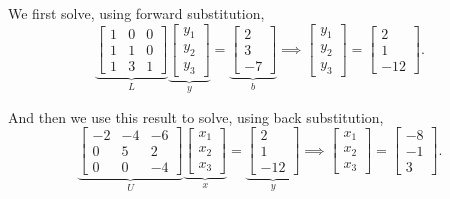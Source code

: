 We first solve, using forward substitution, 
$$\underbrace{\left[\begin{array}{rrr} 1 & 0 & 0\\ 1 & 1 & 0\\ 1 & 3 & 1\end{array} \right]}_{L} \underbrace{\begin{bmatrix}y_1 \\y_2 \\ y_3 \end{bmatrix}}_{y} =\underbrace{\left[\begin{array}{r} 2\\
3 \\ -7 \end{array}\right]}_{b} \implies\begin{bmatrix}y_1 \\y_2 \\ y_3 \end{bmatrix} = \left[\begin{array}{r} 2\\
1 \\ -12\end{array}\right]. $$

And then we use this result to solve, using back substitution,
$$ \underbrace{\left[\begin{array}{rrr} -2 & -4 & -6 \\ 0 & 5 &  2 \\ 0 &  0 & -4\end{array} \right]}_{U} \underbrace{\begin{bmatrix}x_1 \\x_2 \\ x_3 \end{bmatrix}}_{x} =\underbrace{\left[\begin{array}{r} 2\\
1\\ -12 \end{array}\right]}_{y} \implies\begin{bmatrix}x_1 \\x_2 \\ x_3 \end{bmatrix} = \left[\begin{array}{r} -8\\
-1 \\ 3\end{array}\right]. $$
\Qed

\vspace*{.3cm}

